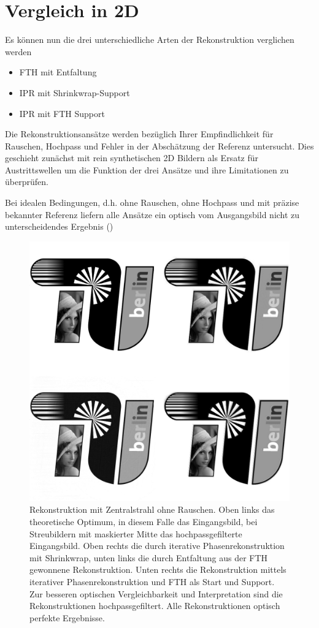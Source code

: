 \section{Vergleich in 2D}	
Es können nun die drei unterschiedliche Arten der Rekonstruktion verglichen werden
\begin{itemize}
\item FTH mit Entfaltung
\item IPR mit Shrinkwrap-Support
\item IPR mit FTH Support
\end{itemize}

Die Rekonstruktionsansätze werden bezüglich Ihrer Empfindlichkeit für Rauschen, Hochpass und Fehler in der Abschätzung der Referenz untersucht. Dies geschieht zunächst mit rein synthetischen 2D Bildern als Ersatz für Austrittswellen um die Funktion der drei Ansätze und ihre Limitationen zu überprüfen.

Bei idealen Bedingungen, d.h. ohne Rauschen, ohne Hochpass und mit präzise bekannter Referenz liefern alle Ansätze ein optisch vom Ausgangsbild nicht zu unterscheidendes Ergebnis ()

\begin{figure}
	\includegraphics[width=.48\textwidth]{images/recon2d-perfect.png}
	\caption[2D Rekonstruktion: Ideal]{Rekonstruktion mit Zentralstrahl ohne Rauschen. Oben links das theoretische Optimum, in diesem Falle das Eingangsbild, bei Streubildern mit maskierter Mitte das hochpassgefilterte Eingangsbild. Oben rechts die durch iterative Phasenrekonstruktion mit Shrinkwrap, unten links die durch Entfaltung  aus der FTH gewonnene Rekonstruktion. Unten rechts die Rekonstruktion mittels iterativer Phasenrekonstruktion und FTH als Start und Support. Zur besseren optischen Vergleichbarkeit und Interpretation sind die Rekonstruktionen hochpassgefiltert. Alle Rekonstruktionen optisch perfekte Ergebnisse.}
	\label{fig:recon2d-perfect}
\end{figure}

